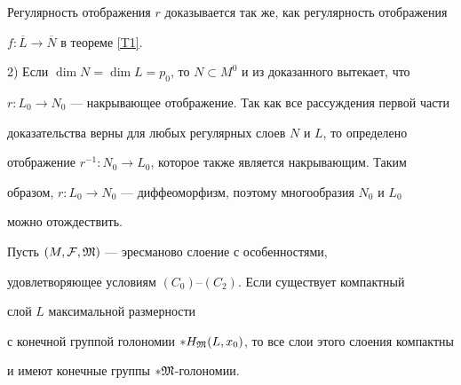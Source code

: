 \begin{pf}
Регулярность отображения $r$ доказывается так же, как регулярность отображения


$f:\overline{L}\to\overline{N}$ в теореме \ref{T1}.





2) Если $\dim N=\dim L=p_0$, то $N\subset M^0$ и из доказанного вытекает, что


$r: L_0\to N_0$ --- накрывающее отображение. Так как все рассуждения первой части


доказательства верны для любых регулярных слоев $N$ и $L$, то определено


отображение $r^{-1}: N_0\to L_0$, которое также является накрывающим. Таким


образом, $r: L_0\to N_0$ --- диффеоморфизм, поэтому многообразия $N_0$ и $L_0$


можно отождествить.


\end{pf}





\begin{thm}\label{T3}


Пусть $(M,{\cal F},\frak M)$ --- эресманово слоение с особенностями,


удовлетворяющее условиям $(C_0)$--$(C_2)$. Если существует компактный


слой $L$ максимальной размерности


с конечной группой голономии $*H_{\frak M}(L,x_0)$, то все слои этого слоения компактны


и имеют конечные группы $*\frak M$-голономии.


\end{thm}





